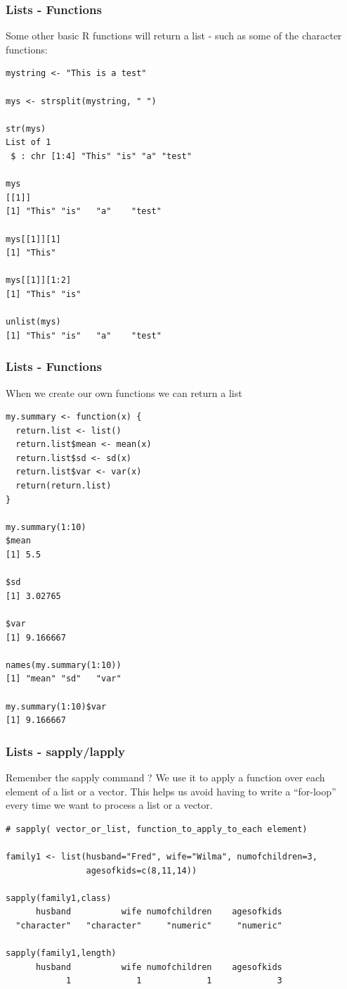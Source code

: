 \documentclass{beamer}
\begin{document}
%
\begin{frame}[fragile]
\frametitle{Lists - Functions}
Some other basic R functions will return a list - such as some of the character functions:
\scriptsize
\begin{verbatim}
mystring <- "This is a test"

mys <- strsplit(mystring, " ")

str(mys)
List of 1
 $ : chr [1:4] "This" "is" "a" "test"

mys
[[1]]
[1] "This" "is"   "a"    "test"

mys[[1]][1]
[1] "This" 

mys[[1]][1:2]
[1] "This" "is"  

unlist(mys)
[1] "This" "is"   "a"    "test"
\end{verbatim}
\end{frame}
%
\begin{frame}[fragile]
\frametitle{Lists - Functions}
When we create our own functions we can return a list
\scriptsize
\begin{verbatim}
my.summary <- function(x) {
  return.list <- list()      
  return.list$mean <- mean(x)
  return.list$sd <- sd(x)
  return.list$var <- var(x)
  return(return.list)   
}

my.summary(1:10)
$mean
[1] 5.5

$sd
[1] 3.02765

$var
[1] 9.166667

names(my.summary(1:10))
[1] "mean" "sd"   "var" 

my.summary(1:10)$var     
[1] 9.166667
\end{verbatim}
\end{frame}

%
\begin{frame}[fragile]
\frametitle{Lists - sapply/lapply}
Remember the sapply command ? We use it to apply a function over each element of a list or a vector. This helps us avoid having to write a ``for-loop'' every time we want to process a list or a vector.
\footnotesize
\begin{verbatim}
# sapply( vector_or_list, function_to_apply_to_each element)

family1 <- list(husband="Fred", wife="Wilma", numofchildren=3, 
                agesofkids=c(8,11,14))

sapply(family1,class)
      husband          wife numofchildren    agesofkids 
  "character"   "character"     "numeric"     "numeric" 

sapply(family1,length)
      husband          wife numofchildren    agesofkids 
            1             1             1             3 

\end{verbatim}
\end{frame}
\end{document}
